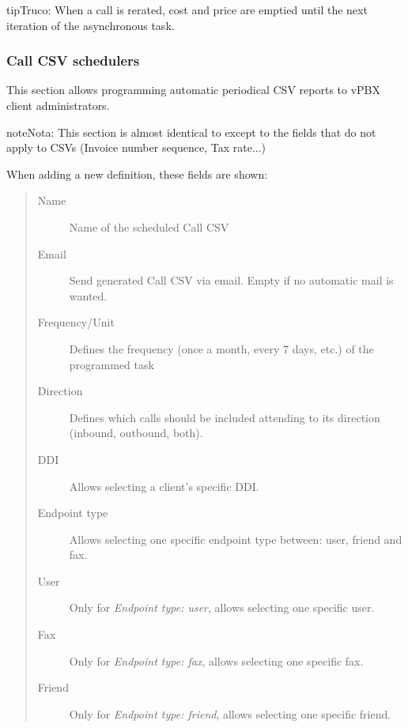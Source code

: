 \documentclass[letterpaper,10pt,spanish]{sphinxmanual}
\begin{document}
\begin{notice}{tip}{Truco:}
When a call is rerated, cost and price are emptied until the next iteration of the asynchronous task.
\end{notice}


\subsubsection{Call CSV schedulers}
\label{administration_portal/client/vpbx/calls/call_csv_schedulers:call-csv-schedulers}\label{administration_portal/client/vpbx/calls/call_csv_schedulers::doc}
This section allows programming automatic periodical CSV reports to vPBX client administrators.

\begin{notice}{note}{Nota:}
This section is almost identical to {\hyperref[administration_portal/brand/invoicing/invoice_schedulers:invoice\string-schedulers]{}} except to the
fields that do not apply to CSVs (Invoice number sequence, Tax rate...)
\end{notice}

When adding a new definition, these fields are shown:
\begin{quote}
\begin{description}
\item[{Name}] \leavevmode
Name of the scheduled Call CSV

\item[{Email}] \leavevmode
Send generated Call CSV via email. Empty if no automatic mail is wanted.

\item[{Frequency/Unit}] \leavevmode
Defines the frequency (once a month, every 7 days, etc.) of the programmed task

\item[{Direction}] \leavevmode
Defines which calls should be included attending to its direction (inbound, outbound, both).

\item[{DDI}] \leavevmode
Allows selecting a client's specific DDI.

\item[{Endpoint type}] \leavevmode
Allows selecting one specific endpoint type between: user, friend and fax.

\item[{User}] \leavevmode
Only for \emph{Endpoint type: user}, allows selecting one specific user.

\item[{Fax}] \leavevmode
Only for \emph{Endpoint type: fax}, allows selecting one specific fax.

\item[{Friend}] \leavevmode
Only for \emph{Endpoint type: friend}, allows selecting one specific friend.

\end{description}
\end{quote}
\end{document}
